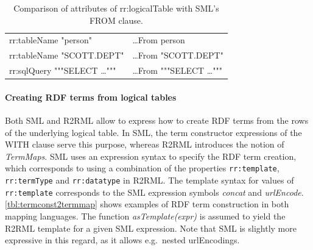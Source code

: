 
\begin{table}[!h]
\centering
\begin{scriptsize}
\begin{tabular}{ll}
\toprule
rr:tableName "person"       & \ldots From person \\
rr:tableName "SCOTT.DEPT"   & \ldots From "SCOTT.DEPT" \\
rr:sqlQuery """SELECT \ldots""" & \ldots From """SELECT \ldots""" \\
\bottomrule
\end{tabular}
\end{scriptsize}
\caption{Comparison of attributes of rr:logicalTable with SML's FROM clause.}
\label{tbl:from-clause}
\end{table}





\paragraph{Creating RDF terms from logical tables}
Both SML and R2RML allow to express how to create RDF terms from the
rows of the underlying logical table. In SML, the term constructor
expressions
of the WITH clause serve this purpose, whereas R2RML introduces the notion of \emph{TermMaps}.
SML uses an expression syntax to specify the RDF term creation, which corresponds to
using a combination of the properties \texttt{rr:template},
\texttt{rr:termType} and \texttt{rr:datatype} in R2RML.
The template syntax for values of \texttt{rr:template} corresponds to
the SML expression symbols \emph{concat} and \emph{urlEncode}.
\autoref{tbl:termconst2termmap} shows examples of RDF term construction in
both mapping languages. The function \emph{asTemplate(expr)} is assumed to
yield the R2RML template for a given SML expression.
Note that SML is slightly more expressive in this regard, as it
allows e.g.~nested urlEncodings.

